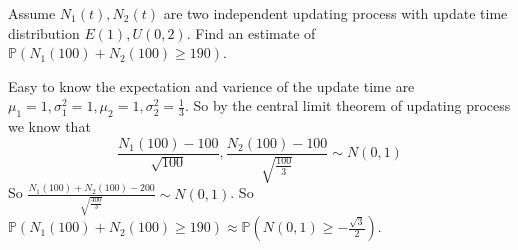 \documentclass{ctexart}
\begin{document}
\begin{problem}\label{pro:5}
  Assume \(N_1(t),N_2(t)\) are two independent updating process with update time distribution
  \(E(1),U(0,2)\).
  Find an estimate of \(\mathbb{P}(N_1(100)+N_2(100) \geq 190)\).
\end{problem}
\begin{solution}
  Easy to know the expectation and varience of the update time are \(\mu_1=1,\sigma_1^2=1,\mu_2=1,\sigma_2^2=\frac{1}{3}\).
  So by the central limit theorem of updating process we know that
  \[
    \frac{N_1(100)-100}{\sqrt{100}},\frac{N_2(100)-100}{\sqrt{\frac{100}{3}}} \sim N(0,1)
  \]
  So \(\frac{N_1(100)+N_2(100)-200}{\sqrt{\frac{400}{3}}} \sim N(0,1)\).
  So \(\mathbb{P}(N_1(100)+N_2(100)\geq 190)\approx \mathbb{P}(N(0,1) \geq -\frac{\sqrt{3}}{2})\).
\end{solution}
\end{document}

